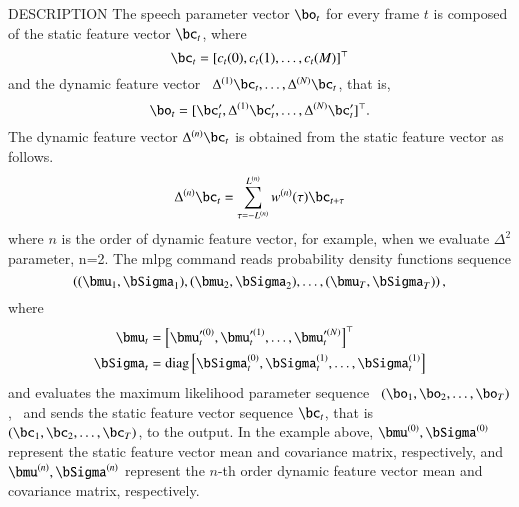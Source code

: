\begin{qsection}{DESCRIPTION}
        The speech parameter vector $\bo_t$ for
        every frame $t$ is composed of the static feature
        vector $\bc_t$, where 
 \begin{displaymath}
	\bc_t = [c_t(0), c_t(1), \dots, c_t(M)]^\top
 \end{displaymath}
	and the dynamic feature vector 
	\ $\Delta^{(1)}\bc_t, \dots, \Delta^{(N)}\bc_t$,
	that is,
 \begin{displaymath}
	\bo_t = [\bc_t', \Delta^{(1)}\bc_t', \dots, \Delta^{(N)}\bc_t']^\top.
 \end{displaymath}
        The dynamic feature vector $\Delta^{(n)}\bc_t$ is
        obtained from the static feature vector as follows.
 \begin{displaymath}
	\Delta^{(n)}\bc_t 
	= \sum_{\tau=-L^{(n)}}^{L^{(n)}} w^{(n)}(\tau)\bc_{t+\tau}
 \end{displaymath}
        where $n$ is the order of dynamic feature vector, for
        example, when we evaluate $\Delta^2$ parameter, n=2.
        The mlpg command reads probability density functions
	sequence
\begin{displaymath}
	\left((\bmu_1, \bSigma_1), (\bmu_2, \bSigma_2), \dots, (\bmu_T, \bSigma_T)
	\right),
\end{displaymath}
where
 \begin{align}
	\bmu_t 
	& =  \left[\bmu^{\prime(0)}_t, \bmu^{\prime(1)}_t, 
		\dots, \bmu^{\prime(N)}_t\right]^\top
		\notag \\
	\bSigma_t 
	& = \diag \left[ \bSigma^{(0)}_t, \bSigma^{(1)}_t, \dots, \bSigma^{(1)}_t \right]
		\notag
 \end{align}
	and evaluates the maximum likelihood parameter sequence
	\ $(\bo_1, \bo_2, \dots, \bo_T)$,
	\ and sends the static feature vector sequence $\bc_t$,
        that is
	\ $(\bc_1, \bc_2, \dots, \bc_T)$,
	to the output.
	In the example above,
	$\bmu^{(0)}, \bSigma^{(0)}$ represent the static feature vector
        mean and covariance matrix, respectively,
        and $\bmu^{(n)}, \bSigma^{(n)}$ represent the $n$-th order dynamic
        feature vector mean and covariance matrix, respectively.
\end{qsection}

